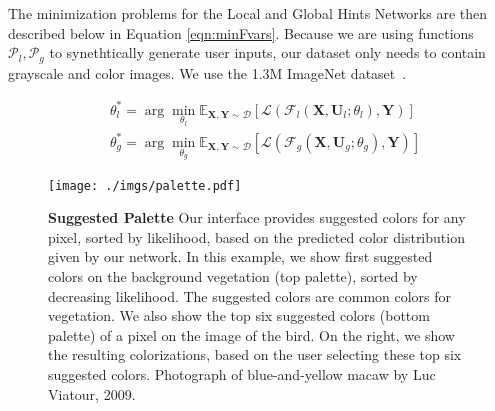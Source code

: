 \documentclass[acmtog,authorversion]{acmart}
\begin{document}
The minimization problems for the Local and Global Hints Networks are then described below in Equation \ref{eqn:minFvars}. Because we are using functions $\mathcal{P}_l, \mathcal{P}_g$ to synethtically generate user inputs, our dataset only needs to contain grayscale and color images. We use the 1.3M ImageNet dataset~\cite{russakovsky2015imagenet}.

\begin{equation}
\begin{split}
& \mathcal{\theta}^{*}_{l} = \arg\min_{\mathcal{\theta}_{l}} \mathds{E}_{\mathbf{X},\mathbf{Y}\sim \mathcal{D}} [ \mathcal{L}(\mathcal{F}_{l}(\mathbf{X},\mathbf{U}_{l}; \theta_{l}),\mathbf{Y}) ] \\
& \mathcal{\theta}^{*}_{g} = \arg\min_{\mathcal{\theta}_{g}} \mathds{E}_{\mathbf{X},\mathbf{Y}\sim \mathcal{D}} [ \mathcal{L}(\mathcal{F}_{g}(\mathbf{X},\mathbf{U}_{g}; \theta_{g}),\mathbf{Y}) ]
\end{split}
\label{eqn:minFvars}
\end{equation}
\vspace{-4mm}

\begin{figure*}[t!]
\centering
\texttt{[image: ./imgs/palette.pdf]}
\caption{\textbf{Suggested Palette} Our interface provides suggested colors for any pixel, sorted by likelihood, based on the predicted color distribution given by our network. In this example, we show first suggested colors on the background vegetation (top palette), sorted by decreasing likelihood. The suggested colors are common colors for vegetation. We also show the top six suggested colors (bottom palette) of a pixel on the image of the bird. On the right, we show the resulting colorizations, based on the user selecting these top six suggested colors. Photograph of blue-and-yellow macaw by Luc Viatour, 2009.}
\vspace{-2mm}
\label{fig:palette}
\end{figure*}
\end{document}
